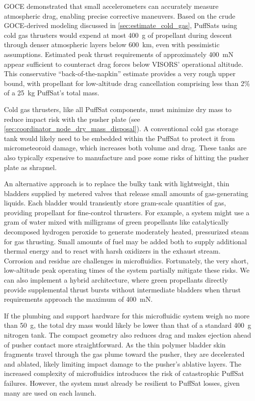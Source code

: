 \documentclass{article}
\begin{document}
GOCE demonstrated that small accelerometers can accurately measure atmospheric drag, enabling precise corrective maneuvers. Based on the crude GOCE-derived modeling discussed in \autoref{sec:estimate_cold_gas}, PuffSats using cold gas thrusters would expend at most \SI{400}{\gram} of propellant during descent through denser atmospheric layers below \SI{600}{\kilo\meter}, even with pessimistic assumptions. Estimated peak thrust requirements of approximately \SI{400}{\milli\newton} appear sufficient to counteract drag forces below VISORS' operational altitude. This conservative “back-of-the-napkin” estimate provides a very rough upper bound, with propellant for low-altitude drag cancellation comprising less than 2\% of a \SI{25}{\kilo\gram} PuffSat's total mass.

Cold gas thrusters, like all PuffSat components, must minimize dry mass to reduce impact risk with the pusher plate (see \autoref{sec:coordinator_node_dry_mass_disposal}). A conventional cold gas storage tank would likely need to be embedded within the PuffSat to protect it from micrometeoroid damage, which increases both volume and drag. These tanks are also typically expensive to manufacture and pose some risks of hitting the pusher plate as shrapnel.

An alternative approach is to replace the bulky tank with lightweight, thin bladders supplied by metered valves that release small amounts of gas-generating liquids.  Each bladder would transiently store gram-scale quantities of gas, providing propellant for fine-control thrusters. For example, a system might use a gram of water mixed with milligrams of green propellants like catalytically decomposed hydrogen peroxide to generate moderately heated, pressurized steam for gas thrusting. Small amounts of fuel may be added both to supply additional thermal energy and to react with harsh oxidizers in the exhaust stream.  Corrosion and residue are challenges in microfluidics. Fortunately, the very short, low-altitude peak operating times of the system partially mitigate these risks. We can also implement a hybrid architecture, where green propellants directly provide supplemental thrust bursts without intermediate bladders when thrust requirements approach the maximum of \SI{400}{\milli\newton}.

If the plumbing and support hardware for this microfluidic system weigh no more than \SI{50}{\gram}, the total dry mass would likely be lower than that of a standard \SI{400}{\gram} nitrogen tank. The compact geometry also reduces drag and makes ejection ahead of pusher contact more straightforward. As the thin polymer bladder skin fragments travel through the gas plume toward the pusher, they are decelerated and ablated, likely limiting impact damage to the pusher's ablative layers.  The increased complexity of microfluidics introduces the risk of catastrophic PuffSat failures. However, the system must already be resilient to PuffSat losses, given many are used on each launch.
\end{document}
